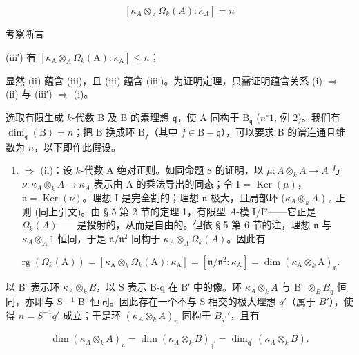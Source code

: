 \[
\left[ \kappa_ {A} \otimes_ {A} \Omega_ {k} (A): \kappa_ {A} \right] = n
\]

考察断言

(iii′) 有 \([\kappa_{\mathrm{A}} \otimes_{A} \Omega_k(\mathrm{A}):\kappa_{\mathrm{A}}] \leqslant n\)；

显然 (ii) 蕴含 (iii)，且 (iii) 蕴含 (iii′)。为证明定理，只需证明蕴含关系 (i) \(\Rightarrow\) (ii) 与 (iii′) \(\Rightarrow\) (i)。

选取有限生成 \(k\)-代数 B 及 B 的素理想 \(\mathfrak{q}\)，使 A 同构于 \(\mathrm{B}_{\mathfrak{q}}\) (\(n^{\circ} 1\), 例 2)。我们有 \(\dim_{\mathfrak{q}}(\mathrm{B}) = n\)；把 B 换成环 \(\mathrm{B}_f\)（其中 \(f \in \mathrm{B} - \mathfrak{q}\)），可以要求 B 的谱连通且维数为 \(n\)，以下即作此假设。

\begin{enumerate}
\def\labelenumi{(\roman{enumi})}
\tightlist
\item
  \(\Rightarrow\) (ii)：设 \(k\)-代数 A 绝对正则。如同命题 8 的证明，以 \(\mu : A \otimes_k A \to A\) 与 \(\nu : \kappa_A \otimes_k A \to \kappa_A\) 表示由 A 的乘法导出的同态；令 I = \(\operatorname{Ker}(\mu)\)，\(\mathfrak{n} = \operatorname{Ker}(\nu)\)。理想 I 是完全割的；理想 \(\mathfrak{n}\) 极大，且局部环 (\(\kappa_A \otimes_k A\) ) \(_{\mathfrak{n}}\) 正则 (同上引文)。由 § 5 第 2 节的定理 1，有限型 \(A\)-模 I/I²——它正是 \(\Omega_k(A)\)——是投射的，从而是自由的。但依 § 5 第 6 节的注，理想 \(\mathfrak{n}\) 与 \(\kappa_A \otimes_A 1\) 恒同，于是 \(\mathfrak{n}/\mathfrak{n}^2\) 同构于 \(\kappa_A \otimes_A \Omega_k(A)\)。因此有
\end{enumerate}

\[
\operatorname{rg} \left(\Omega_ {k} (\mathrm{A})\right) = \left[ \kappa_ {\mathrm{A}} \otimes_ {k} \Omega_ {k} (\mathrm{A}): \kappa_ {\mathrm{A}} \right] = \left[ \mathfrak {n} / \mathfrak {n} ^ {2}: \kappa_ {\mathrm{A}} \right] = \dim \left(\kappa_ {\mathrm{A}} \otimes_ {k} \mathrm{A}\right) _ {\mathfrak {n}}.
\]

以 B′ 表示环 \(\kappa_{A}\otimes_{k}B\)，以 S 表示 B-q 在 B′ 中的像。环 \(\kappa_{A}\otimes_{k}A\) 与 B′ \(\otimes_{B}B_{q}\) 恒同，亦即与 S \(^{-1}\) B′ 恒同。因此存在一个不与 S 相交的极大理想 \(q'\)（属于 \(B'\)），使得 \(n = S^{-1}q'\) 成立；于是环 \((\kappa_A \otimes_k A)_n\) 同构于 \(B_{q'}'\)，且有

\[
\dim (\kappa_ {A} \otimes_ {k} A) _ {\mathfrak {n}} = \dim (\kappa_ {A} \otimes_ {k} B) _ {\mathfrak {q} ^ {\prime}} = \dim_ {\mathfrak {q} ^ {\prime}} (\kappa_ {A} \otimes_ {k} B).
\]

